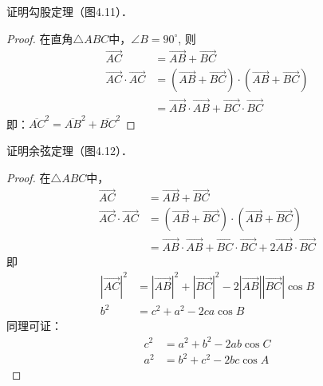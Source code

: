 \begin{example}
    证明勾股定理（图4.11）．
\end{example}

\begin{proof}
    在直角$\triangle ABC$中，$\angle B=90^{\circ}$, 则
\[\begin{split}
   \Vec{AC}&=\Vec{AB}+\Vec{BC}\\
   \Vec{AC}\cdot \Vec{AC}&= \left(\Vec{AB}+\Vec{BC}\right)\cdot \left(\Vec{AB}+\Vec{BC}\right)\\
   &=\Vec{AB}\cdot \Vec{AB}+\Vec{BC}\cdot \Vec{BC}
\end{split}\]
即：$\overline{AC}^2=\overline{AB}^2+\overline{BC}^2$
\end{proof}

\begin{figure}[htp]\centering
    \begin{minipage}[t]{0.48\textwidth}
    \centering
{}
    \caption{}
    \end{minipage}
    \begin{minipage}[t]{0.48\textwidth}
    \centering
    \caption{}
    \end{minipage}
    \end{figure}


\begin{example}
    证明余弦定理（图4.12）．
\end{example}

\begin{proof}
在$\triangle ABC$中，
\[\begin{split}
    \Vec{AC}&=\Vec{AB}+\Vec{BC}\\
    \Vec{AC}\cdot  \Vec{AC}&=\left(\Vec{AB}+\Vec{BC}\right)\cdot \left(\Vec{AB}+\Vec{BC}\right)\\
    &=\Vec{AB}\cdot \Vec{AB}+\Vec{BC}\cdot \Vec{BC}+2\Vec{AB}\cdot \Vec{BC}
\end{split}\]
即
\[\begin{split}
    |\Vec{AC}|^2&=|\Vec{AB}|^2+|\Vec{BC}|^2-2|\Vec{AB}||\Vec{BC}|\cos B\\
b^2&=c^2+a^2-2ca\cos B
\end{split}\]
同理可证：
\[\begin{split}
  c^2&=a^2+b^2-2ab\cos C\\
a^2&=b^2+c^2-2bc\cos A  
\end{split}\]
\end{proof}

